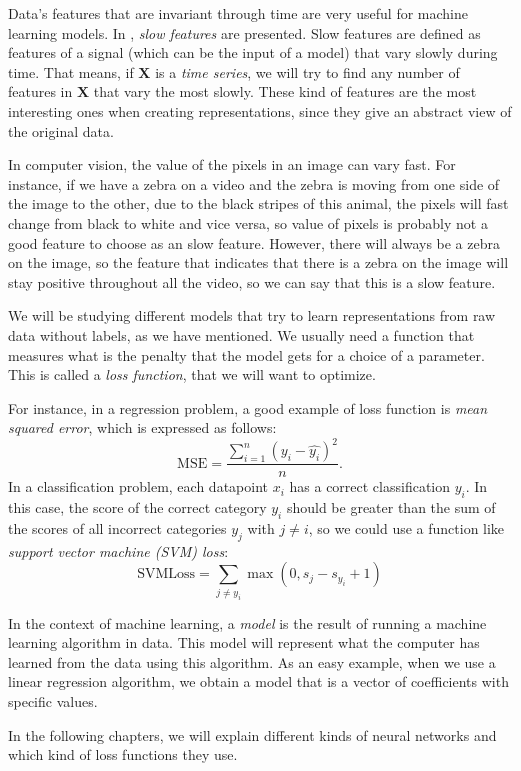 Data's features that are invariant through time are very useful for machine learning models. In \citep{wiskott_slow_2002}, \emph{slow features} are presented. Slow features are defined as features of a signal 
(which can be the input of a model) that vary slowly during time. That means, if $\bm{X}$ is a \emph{time series}\footnotemark, we will try to find any number of features in $\bm{X}$ that vary the most slowly.
These kind of features are the most interesting ones when creating representations, since they give an abstract view of the original data.



\begin{nexample} In computer vision, the value of the pixels in an image can vary fast. For instance, if we have a zebra on a video and the zebra is moving from one side of the image to the other, due 
to the black stripes of this animal, the pixels will fast change from black to white and vice versa, so value of pixels is probably not a good feature to choose as an slow feature. However, there will always
be a zebra on the image, so the feature that indicates that there is a zebra on the image will stay positive throughout all the video, so we can say that this is a slow feature.
\end{nexample}

We will be studying different models that try to learn representations from raw data without labels, as we have mentioned. We usually need a function that measures what is the penalty that the model gets for a choice of a parameter.
This is called a \emph{loss function}, that we will want to optimize.

For instance, in a regression problem, a good example of loss function is \emph{mean squared error}, which is expressed as follows:
\[
\text{MSE} = \frac{\sum_{i =1 }^n \left(y_i - \hat{y_i}\right)^2}{n}.
\]
In a classification problem, each datapoint $x_i$ has a correct classification $y_i$. In this case, the score of the correct category $y_i$ should be greater than the sum of the scores of all incorrect categories $y_j$ with $j \neq i$,
 so we could use a function like \emph{support vector machine (SVM) loss}:
\[
\text{SVMLoss} = \sum_{j \neq y_i} \max(0,s_j - s_{y_i} + 1)
\]


In the context of machine learning, a \emph{model} is the result of running a machine learning algorithm in data. This model will represent what the computer has learned from the data using this algorithm. As an easy example, when we use a
linear regression algorithm, we obtain a model that is a vector of coefficients with specific values.

In the following chapters, we will explain different kinds of neural networks and which kind of loss functions they use. 
